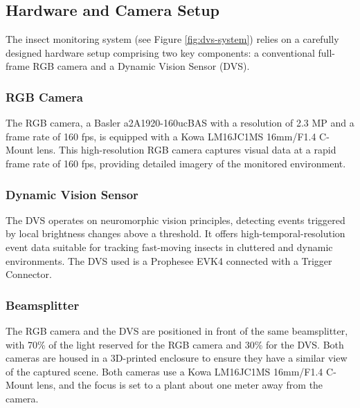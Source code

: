 \documentclass[sigchi,screen]{acmart}
\begin{document}
\subsection{Hardware and Camera Setup}
\label{ch:hardware-setup}
The insect monitoring system (see Figure \ref{fig:dvs-system}) relies on a carefully designed hardware setup comprising two key components: a conventional full-frame RGB camera and a Dynamic Vision Sensor (DVS).

\subsubsection{RGB Camera}
The RGB camera, a Basler a2A1920-160ucBAS with a resolution of 2.3 MP and a frame rate of 160 fps, is equipped with a Kowa LM16JC1MS 16mm/F1.4 C-Mount lens. This high-resolution RGB camera captures visual data at a rapid frame rate of 160 fps, providing detailed imagery of the monitored environment.

\subsubsection{Dynamic Vision Sensor}
The DVS operates on neuromorphic vision principles, detecting events triggered by local brightness changes above a threshold. It offers high-temporal-resolution event data suitable for tracking fast-moving insects in cluttered and dynamic environments. The DVS used is a Prophesee EVK4 connected with a Trigger Connector.

\subsubsection{Beamsplitter}
The RGB camera and the DVS are positioned in front of the same beamsplitter, with 70\% of the light reserved for the RGB camera and 30\% for the DVS. Both cameras are housed in a 3D-printed enclosure to ensure they have a similar view of the captured scene. Both cameras use a Kowa LM16JC1MS 16mm/F1.4 C-Mount lens, and the focus is set to a plant about one meter away from the camera.

\end{document}

